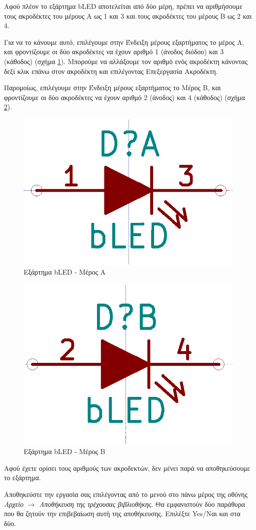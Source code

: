 \documentclass[a4paper]{article}
\begin{document}
Αφού πλέον το εξάρτημα bLED αποτελείται από δύο μέρη, πρέπει να αριθμήσουμε τους ακροδέκτες του μέρους Α ως 1 και 3 και τους ακροδέκτες του μέρους Β ως 2 και 4.

Για να το κάνουμε αυτό, επιλέγουμε στην Ένδειξη μέρους εξαρτήματος το μέρος A, και φροντίζουμε οι δύο ακροδέκτες να έχουν αριθμό 1 (άνοδος διόδου) και 3 (κάθοδος) (σχήμα \ref{fig:libed-circ-bleda}). Μπορούμε να αλλάξουμε τον αριθμό ενός ακροδέκτη κάνοντας δεξί κλικ επάνω στον ακροδέκτη και επιλέγοντας Επεξεργασία Ακροδέκτη.

Παρομοίως, επιλέγουμε στην Ένδειξη μέρους εξαρτήματος το Μέρος B, και φροντίζουμε οι δύο ακροδέκτες να έχουν αριθμό 2 (άνοδος) και 4 (κάθοδος) (σχήμα \ref{fig:libed-circ-bledb}). 

\begin{figure}
  \begin{center}
    \includegraphics[width=.35\textwidth]{img/libed-circ-bleda.png}
    \caption{Εξάρτημα bLED - Μέρος Α}
    \label{fig:libed-circ-bleda}
  \end{center}
\end{figure}

\begin{figure}
  \begin{center}
    \includegraphics[width=.35\textwidth]{img/libed-circ-bledb.png}
    \caption{Εξάρτημα bLED - Μέρος Β}
    \label{fig:libed-circ-bledb}
  \end{center}
\end{figure}

Αφού έχετε ορίσει τους αριθμούς των ακροδεκτών, δεν μένει παρά να αποθηκεύσουμε το εξάρτημα.

Αποθηκεύστε την εργασία σας επιλέγοντας από το μενού στο πάνω μέρος της οθόνης \textit{Αρχείο $\rightarrow$ Αποθήκευση της τρέχουσας βιβλιοθήκης}. Θα εμφανιστούν δύο παράθυρα που θα ζητούν την επιβεβαίωση αυτή της αποθήκευσης. Επιλέξτε Yes/Ναι και στα δύο.
\end{document}
